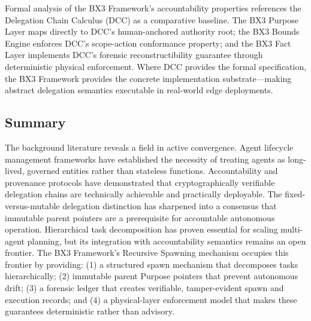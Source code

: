 Formal analysis of the BX3 Framework's accountability properties references the Delegation Chain Calculus (DCC) \cite{sentinel_2025} as a comparative baseline. The BX3 Purpose Layer maps directly to DCC's human-anchored authority root; the BX3 Bounds Engine enforces DCC's scope-action conformance property; and the BX3 Fact Layer implements DCC's forensic reconstructibility guarantee through deterministic physical enforcement. Where DCC provides the formal specification, the BX3 Framework provides the concrete implementation substrate---making abstract delegation semantics executable in real-world edge deployments.

\subsection{Summary}
\label{sec:background_summary}

The background literature reveals a field in active convergence. Agent lifecycle management frameworks have established the necessity of treating agents as long-lived, governed entities rather than stateless functions. Accountability and provenance protocols have demonstrated that cryptographically verifiable delegation chains are technically achievable and practically deployable. The fixed-versus-mutable delegation distinction has sharpened into a consensus that immutable parent pointers are a prerequisite for accountable autonomous operation. Hierarchical task decomposition has proven essential for scaling multi-agent planning, but its integration with accountability semantics remains an open frontier. The BX3 Framework's Recursive Spawning mechanism occupies this frontier by providing: (1) a structured spawn mechanism that decomposes tasks hierarchically; (2) immutable parent Purpose pointers that prevent autonomous drift; (3) a forensic ledger that creates verifiable, tamper-evident spawn and execution records; and (4) a physical-layer enforcement model that makes these guarantees deterministic rather than advisory.

